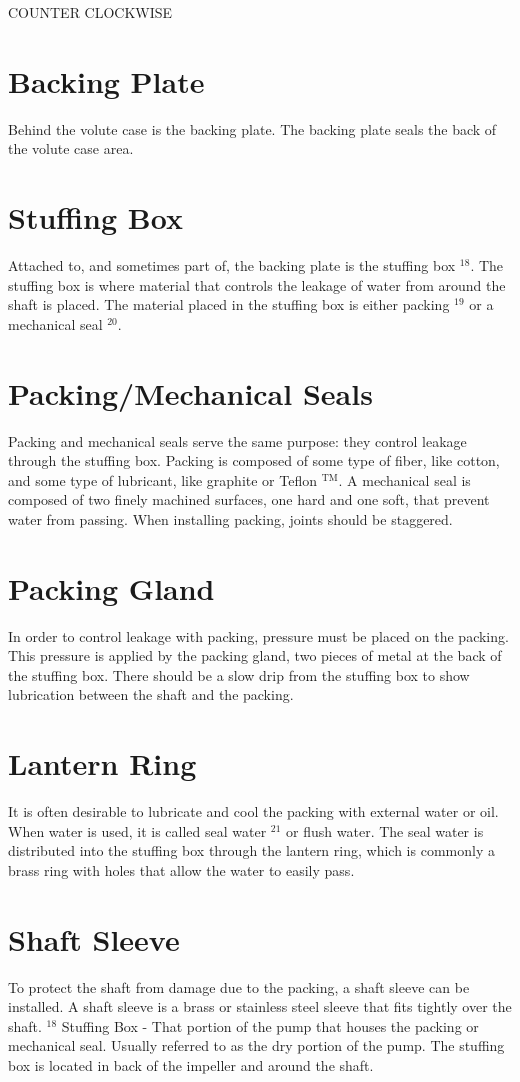 \documentclass[10pt]{article}
\begin{document}
COUNTER CLOCKWISE

\section{Backing Plate}
Behind the volute case is the backing plate. The backing plate seals the back of the volute case area.

\section{Stuffing Box}
Attached to, and sometimes part of, the backing plate is the stuffing box ${ }^{18}$. The stuffing box is where material that controls the leakage of water from around the shaft is placed. The material placed in the stuffing box is either packing ${ }^{19}$ or a mechanical seal $^{20}$.

\section{Packing/Mechanical Seals}
Packing and mechanical seals serve the same purpose: they control leakage through the stuffing box. Packing is composed of some type of fiber, like cotton, and some type of lubricant, like graphite or Teflon ${ }^{\mathrm{TM}}$. A mechanical seal is composed of two finely machined surfaces, one hard and one soft, that prevent water from passing. When installing packing, joints should be staggered.

\section{Packing Gland}
In order to control leakage with packing, pressure must be placed on the packing. This pressure is applied by the packing gland, two pieces of metal at the back of the stuffing box. There should be a slow drip from the stuffing box to show lubrication between the shaft and the packing.

\section{Lantern Ring}
It is often desirable to lubricate and cool the packing with external water or oil. When water is used, it is called seal water ${ }^{21}$ or flush water. The seal water is distributed into the stuffing box through the lantern ring, which is commonly a brass ring with holes that allow the water to easily pass.

\section{Shaft Sleeve}
To protect the shaft from damage due to the packing, a shaft sleeve can be installed. A shaft sleeve is a brass or stainless steel sleeve that fits tightly over the shaft. ${ }^{18}$ Stuffing Box - That portion of the pump that houses the packing or mechanical seal. Usually referred to as the dry portion of the pump. The stuffing box is located in back of the impeller and around the shaft.
\end{document}
